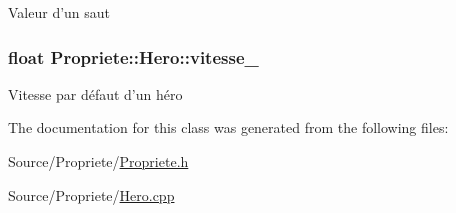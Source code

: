 Valeur d'un saut \hypertarget{classPropriete_1_1Hero_a63cb50c4676afadb7169dd2bd2119a5d}{
\subsubsection[{vitesse\-\_\-}]{\setlength{\rightskip}{0pt plus 5cm}float Propriete\-::\-Hero\-::vitesse\-\_\-\hspace{0.3cm}{\ttfamily [private]}}}\label{classPropriete_1_1Hero_a63cb50c4676afadb7169dd2bd2119a5d}
Vitesse par défaut d'un héro 

The documentation for this class was generated from the following files\-:\begin{DoxyCompactItemize}
\item 
Source/\-Propriete/\hyperlink{Propriete_8h}{Propriete.\-h}\item 
Source/\-Propriete/\hyperlink{Propriete_2Hero_8cpp}{Hero.\-cpp}\end{DoxyCompactItemize}
